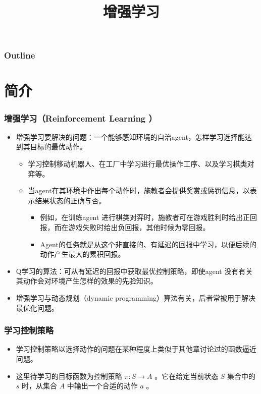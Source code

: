 \documentclass{beamer}
\title{增强学习}
\author{}
\date{}
\begin{document}
\maketitle

\begin{frame}
\frametitle{Outline}
\setcounter{tocdepth}{3}
\tableofcontents
\end{frame}














\section{简介}
\label{sec-1}
\begin{frame}
\frametitle{增强学习（Reinforcement Learning ）}
\label{sec-1-1}

\begin{itemize}
\item 增强学习要解决的问题：一个能够感知环境的自治agent，怎样学习选择能达到其目标的最优动作。
\begin{itemize}
\item 学习控制移动机器人、在工厂中学习进行最优操作工序、以及学习棋类对弈等。
\item 当agent在其环境中作出每个动作时，施教者会提供奖赏或惩罚信息，以表示结果状态的正确与否。
\begin{itemize}
\item 例如，在训练agent 进行棋类对弈时，施教者可在游戏胜利时给出正回报，而在游戏失败时给出负回报，其他时候为零回报。
\item Agent的任务就是从这个非直接的、有延迟的回报中学习，以便后续的动作产生最大的累积回报。
\end{itemize}
\end{itemize}
\item Q学习的算法：可从有延迟的回报中获取最优控制策略，即使agent 没有有关其动作会对环境产生怎样的效果的先验知识。
\item 增强学习与动态规划（dynamic programming）算法有关，后者常被用于解决最优化问题。
\end{itemize}
\end{frame}
\begin{frame}
\frametitle{学习控制策略}
\label{sec-1-2}

\begin{itemize}
\item 学习控制策略以选择动作的问题在某种程度上类似于其他章讨论过的函数逼近问题。
\item 这里待学习的目标函数为控制策略 $\pi : S \rightarrow A$ 。它在给定当前状态 $S$ 集合中的 $s$ 时，从集合 $A$ 中输出一个合适的动作 $a$ 。
\end{itemize}
\end{frame}
\end{document}
